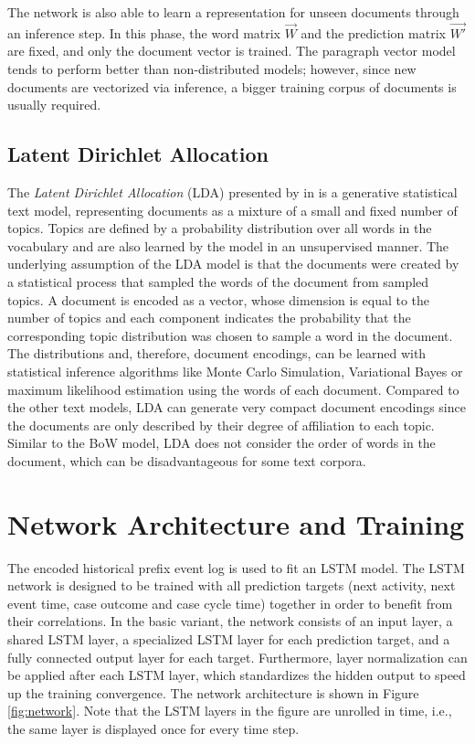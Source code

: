 The network is also able to learn a representation for unseen documents through an inference step.
In this phase, the word matrix $\vec{W}$ and the prediction matrix $\vec{W'}$ are fixed, and only the document vector is trained.
The paragraph vector model tends to perform better than non-distributed models; however, since new documents are vectorized via inference, a bigger training corpus of documents is usually required.

\subsection{Latent Dirichlet Allocation}\label{sec:lda}

The \textit{Latent Dirichlet Allocation} (LDA) presented by \citeauthor{DBLP:journals/jmlr/BleiNJ03} in \citeyear{DBLP:journals/jmlr/BleiNJ03} \cite{DBLP:journals/jmlr/BleiNJ03} is a generative statistical text model, representing documents as a mixture of a small and fixed number of topics.
Topics are defined by a probability distribution over all words in the vocabulary and are also learned by the model in an unsupervised manner.
The underlying assumption of the LDA model is that the documents were created by a statistical process that sampled the words of the document from sampled topics.
A document is encoded as a vector, whose dimension is equal to the number of topics and each component indicates the probability that the corresponding topic distribution was chosen to sample a word in the document.
The distributions and, therefore, document encodings, can be learned with statistical inference algorithms like Monte Carlo Simulation, Variational Bayes or maximum likelihood estimation using the words of each document.
Compared to the other text models, LDA can generate very compact document encodings since the documents are only described by their degree of affiliation to each topic.
Similar to the BoW model, LDA does not consider the order of words in the document, which can be disadvantageous for some text corpora.

\section{Network Architecture and Training}
The encoded historical prefix event log is used to fit an LSTM model.
The LSTM network is designed to be trained with all prediction targets (next activity, next event time, case outcome and case cycle time) together in order to benefit from their correlations.
In the basic variant, the network consists of an input layer, a shared LSTM layer, a specialized LSTM layer for each prediction target, and a fully connected output layer for each target.
Furthermore, layer normalization \cite{DBLP:journals/corr/BaKH16} can be applied after each LSTM layer, which standardizes the hidden output to speed up the training convergence.
The network architecture is shown in Figure \ref{fig:network}.
Note that the LSTM layers in the figure are unrolled in time, i.e., the same layer is displayed once for every time step.


